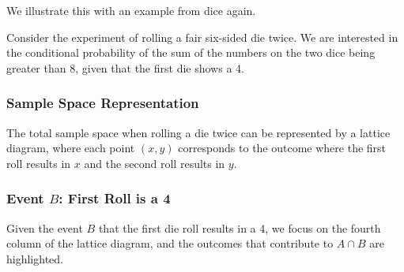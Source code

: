 We illustrate this with an example from dice again.

\begin{example}
Consider the experiment of rolling a fair six-sided die twice. We are interested in the conditional probability of the sum of the numbers on the two dice being greater than 8, given that the first die shows a 4.

\subsubsection*{Sample Space Representation}
The total sample space when rolling a die twice can be represented by a lattice diagram, where each point \((x,y)\) corresponds to the outcome where the first roll results in \(x\) and the second roll results in \(y\).

\begin{center}
\end{center}

\subsubsection*{Event \(B\): First Roll is a 4}
Given the event \(B\) that the first die roll results in a 4, we focus on the fourth column of the lattice diagram, and the outcomes that contribute to \(A \cap B\) are highlighted.

\begin{center}
\end{center}
\end{example}

